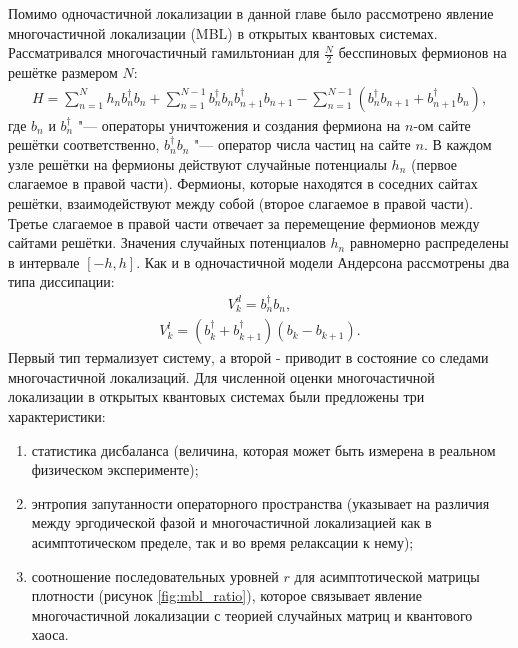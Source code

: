 Помимо одночастичной локализации в данной главе было рассмотрено явление многочастичной локализации (MBL) в открытых квантовых системах. Рассматривался многочастичный гамильтониан для \(\frac{N}{2}\) бесспиновых фермионов на решётке размером \(N\): 
\begin{equation}
\label{eq:mbl_H}
\begin{gathered}
H = \sum_{n=1}^{N} h_n b^{\dagger}_n b_n + \sum_{n=1}^{N-1} b^{\dagger}_n b_n b^{\dagger}_{n+1} b_{n+1} - \sum_{n=1}^{N-1} \left( b^{\dagger}_n b_{n+1} + b^{\dagger}_{n+1} b_n \right) ,
\end{gathered}
\end{equation}
где \(b_n\) и \(b^{\dagger}_n\) "--- операторы уничтожения и создания фермиона на \(n\)-ом сайте решётки соответственно, \(b^{\dagger}_n b_n\) "--- оператор числа частиц на сайте \(n\).
В каждом узле решётки на фермионы действуют случайные потенциалы \(h_n\) (первое слагаемое в правой части). Фермионы, которые находятся в соседних сайтах решётки, взаимодействуют между собой (второе слагаемое в правой части). Третье слагаемое в правой части отвечает за перемещение фермионов между сайтами решётки. Значения случайных потенциалов \(h_n\) равномерно распределены в интервале \(\left[-h, h \right]\).
Как и в одночастичной модели Андерсона рассмотрены два типа диссипации:
\begin{equation}
\label{eq:mbl_diss_dephase}
\begin{gathered}
V^d_k = b^{\dagger}_n b_n,
\end{gathered}
\end{equation}
\begin{equation}
\label{eq:mbl_diss_diehl}
\begin{gathered}
V^l_k = ( b^\dagger_k + b^\dagger_{k+1}) \left( b_k - b_{k+1} \right).
\end{gathered}
\end{equation}
Первый тип термализует систему, а второй - приводит в состояние со следами многочастичной локализаций. 
Для численной оценки многочастичной локализации в открытых квантовых системах были предложены три характеристики:
\begin{enumerate}[beginpenalty=10000] %
	\item статистика дисбаланса (величина, которая может быть измерена в реальном физическом эксперименте);
	\item энтропия запутанности операторного пространства (указывает на различия между эргодической фазой и многочастичной локализацией как в асимптотическом пределе, так и во время релаксации к нему);
	\item соотношение последовательных уровней \(r\) для асимптотической матрицы плотности (рисунок \ref{fig:mbl_ratio}), которое связывает явление многочастичной локализации с теорией случайных матриц и квантового хаоса.
\end{enumerate} 

